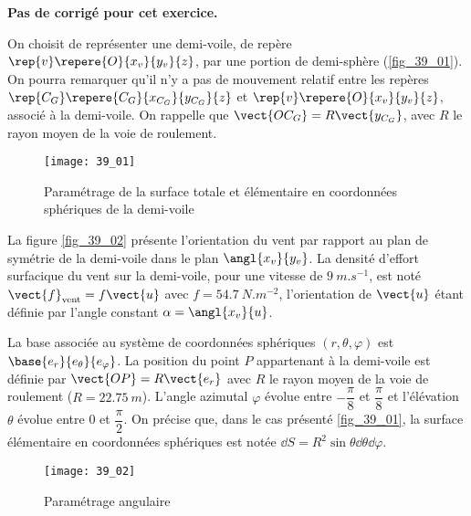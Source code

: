 \normaltrue \difficilefalse \tdifficilefalse
\correctionfalse


\setcounter{numques}{0}
\ifcorrection
\else
\textbf{Pas de corrigé pour cet exercice.}
\fi

\ifprof
\else
On choisit de représenter une demi-voile, de repère $\rep{v}\repere{O}{x_v}{y_v}{z}$, par une portion de demi-sphère (\autoref{fig_39_01}).
On pourra remarquer qu’il n’y a pas de mouvement relatif entre les repères $\rep{C_G}\repere{C_G}{x_{C_G}}{y_{C_G}}{z}$ et $\rep{v}\repere{O}{x_v}{y_v}{z}$, 
associé à la demi-voile. On rappelle que $\vect{OC_G}=R\vect{y_{C_G}}$, avec $R$ le rayon moyen de la voie de roulement.


\begin{figure}[H]
\centering
\texttt{[image: 39\_01]}
\caption{Paramétrage de la surface totale et élémentaire en coordonnées sphériques de la demi-voile \label{fig_39_01}}
\end{figure}

La figure \autoref{fig_39_02} présente l’orientation du vent par rapport au plan de symétrie de la demi-voile dans le plan $\angl{x_v}{y_v}$. La densité d’effort surfacique du vent sur la demi-voile, pour une vitesse de $\SI{9}{m.s^{-1}}$, est noté $\vect{f}_{\text{vent}}=f\vect{u}$ avec $f=\SI{54,7}{N.m^{-2}}$, l’orientation de $\vect{u}$ étant définie par l’angle constant $\alpha=\angl{x_v}{u}$.

La base associée au système de coordonnées sphériques $\left(r,\theta,\varphi\right)$ est $\base{e_r}{e_{\theta}}{e_{\varphi}}$. La position du point $P$ appartenant
à la demi-voile est définie par $\vect{OP}=R\vect{e_r}$ avec $R$ le rayon moyen de la voie de roulement ($R=\SI{22,75}{m}$).
L’angle azimutal $\varphi$ évolue entre $-\dfrac{\pi}{8}$ et $\dfrac{\pi}{8}$ et l’élévation $\theta$ évolue entre 0 et $\dfrac{\pi}{2}$.
On précise que, dans le cas présenté \autoref{fig_39_01}, la surface élémentaire en coordonnées sphériques est notée
$\dd S =R^2 \sin \theta \dd\theta \dd \varphi$.


\begin{figure}[H]
\centering
\texttt{[image: 39\_02]}
\caption{Paramétrage angulaire \label{fig_39_02}}
\end{figure}


